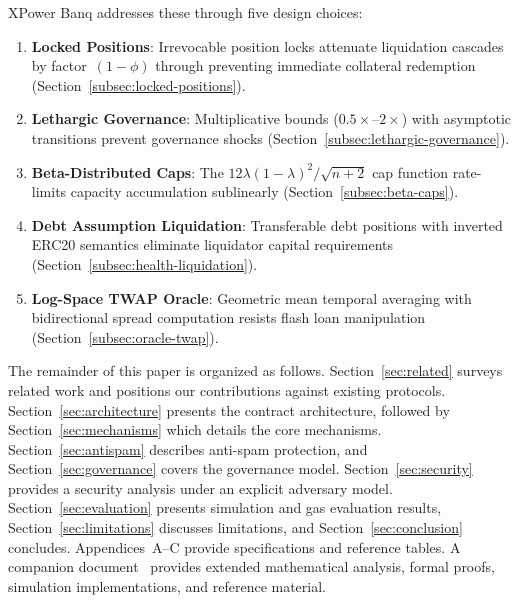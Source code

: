 \documentclass[10pt,a4paper,twocolumn]{article}
\begin{document}
XPower Banq addresses these through five design choices:

\begin{enumerate}[leftmargin=*]
\item \textbf{Locked Positions}: Irrevocable position locks attenuate liquidation cascades by factor~$(1{-}\phi)$ through preventing immediate collateral redemption (Section~\ref{subsec:locked-positions}).

\item \textbf{Lethargic Governance}: Multiplicative bounds ($0.5\times$--$2\times$) with asymptotic transitions prevent governance shocks (Section~\ref{subsec:lethargic-governance}).

\item \textbf{Beta-Distributed Caps}: The \mbox{$12\lambda(1{-}\lambda)^2/\sqrt{n{+}2}$} cap function rate-limits capacity accumulation sublinearly (Section~\ref{subsec:beta-caps}).

\item \textbf{Debt Assumption Liquidation}: Transferable debt positions with inverted ERC20 semantics eliminate liquidator capital requirements (Section~\ref{subsec:health-liquidation}).

\item \textbf{Log-Space TWAP Oracle}: Geometric mean temporal averaging with bidirectional spread computation resists flash loan manipulation (Section~\ref{subsec:oracle-twap}).
\end{enumerate}

The remainder of this paper is organized as follows. Section~\ref{sec:related} surveys related work and positions our contributions against existing protocols. Section~\ref{sec:architecture} presents the contract architecture, followed by Section~\ref{sec:mechanisms} which details the core mechanisms. Section~\ref{sec:antispam} describes anti-spam protection, and Section~\ref{sec:governance} covers the governance model. Section~\ref{sec:security} provides a security analysis under an explicit adversary model. Section~\ref{sec:evaluation} presents simulation and gas evaluation results, Section~\ref{sec:limitations} discusses limitations, and Section~\ref{sec:conclusion} concludes. Appendices~A--C provide specifications and reference tables. A companion document~\cite{mtp,sim,ref} provides extended mathematical analysis, formal proofs, simulation implementations, and reference material.

\end{document}
